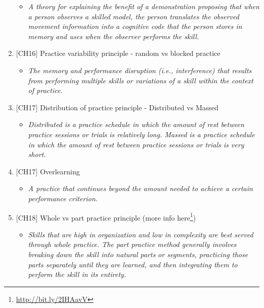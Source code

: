 \documentclass[
  letterpaper,
  DIV=11,
  numbers=noendperiod]{scrartcl}
\providecommand{\tightlist}{%
  \setlength{\itemsep}{0pt}\setlength{\parskip}{0pt}}\usepackage{longtable,booktabs,array}
\DeclareRobustCommand{\href}[2]{#2\footnote{\url{#1}}}
\begin{document}
\begin{enumerate}
  \begin{itemize}
  \tightlist
  \item
    \emph{A theory for explaining the benefit of a demonstration
    proposing that when a person observes a skilled model, the person
    translates the observed movement information into a cognitive code
    that the person stores in memory and uses when the observer performs
    the skill.}
  \end{itemize}
\item
  {[}CH16{]} Practice variability principle - random vs blocked practice

  \begin{itemize}
  \tightlist
  \item
    \emph{The memory and performance disruption (i.e., interference)
    that results from performing multiple skills or variations of a
    skill within the context of practice.}
  \end{itemize}
\item
  {[}CH17{]} Distribution of practice principle - Distributed vs Massed

  \begin{itemize}
  \tightlist
  \item
    \emph{Distributed is a practice schedule in which the amount of rest
    between practice sessions or trials is relatively long. Massed is a
    practice schedule in which the amount of rest between practice
    sessions or trials is very short.}
  \end{itemize}
\item
  {[}CH17{]} Overlearning

  \begin{itemize}
  \tightlist
  \item
    \emph{A practice that continues beyond the amount needed to achieve
    a certain performance criterion.}
  \end{itemize}
\item
  {[}CH18{]} Whole vs part practice principle
  (\href{http://bit.ly/2IHAavV}{more info here})

  \begin{itemize}
  \tightlist
  \item
    \emph{Skills that are high in organization and low in complexity are
    best served through whole practice. The part practice method
    generally involves breaking down the skill into natural parts or
    segments, practicing those parts separately until they are learned,
    and then integrating them to perform the skill in its entirety.}
  \end{itemize}
\end{enumerate}
\end{document}
